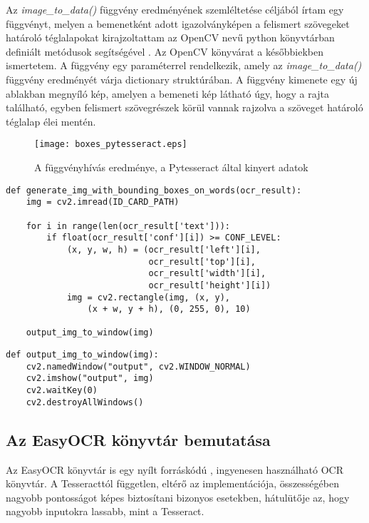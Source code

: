 \documentclass[12pt]{report}
\begin{document}
\pagebreak
Az \emph{image\_to\_data()} függvény eredményének szemléltetése céljából írtam egy függvényt, melyen a bemenetként adott igazolványképen a felismert szövegeket határoló téglalapokat kirajzoltattam az OpenCV nevű python könyvtárban definiált metódusok segítségével \cite{opencv}. Az OpenCV könyvárat a későbbiekben ismertetem. A függvény egy paraméterrel rendelkezik, amely az \emph{image\_to\_data()} függvény eredményét várja dictionary struktúrában. A függvény kimenete egy új ablakban megnyíló kép, amelyen a bemeneti kép látható úgy, hogy a rajta található, egyben felismert szövegrészek körül vannak rajzolva a szöveget határoló téglalap élei mentén.

\begin{figure}[h]
    \centerline{\texttt{[image: boxes\_pytesseract.eps]}}
    \caption{A függvényhívás eredménye, a Pytesseract által kinyert adatok}
\end{figure}

\begin{verbatim}
def generate_img_with_bounding_boxes_on_words(ocr_result):
    img = cv2.imread(ID_CARD_PATH)

    for i in range(len(ocr_result['text'])):
        if float(ocr_result['conf'][i]) >= CONF_LEVEL:
            (x, y, w, h) = (ocr_result['left'][i],
                            ocr_result['top'][i],
                            ocr_result['width'][i],
                            ocr_result['height'][i])
            img = cv2.rectangle(img, (x, y),
                (x + w, y + h), (0, 255, 0), 10)

    output_img_to_window(img)
\end{verbatim}

\begin{verbatim}
def output_img_to_window(img):
    cv2.namedWindow("output", cv2.WINDOW_NORMAL)
    cv2.imshow("output", img)
    cv2.waitKey(0)
    cv2.destroyAllWindows()
\end{verbatim}

\subsection{Az EasyOCR könyvtár bemutatása}

Az EasyOCR könyvtár is egy nyílt forráskódú \cite{easyocr}, ingyenesen használható OCR könyvtár. A Tesseracttól független, eltérő az implementációja, összességében nagyobb pontosságot képes biztosítani bizonyos esetekben, hátulütője az, hogy nagyobb inputokra lassabb, mint a Tesseract.
\end{document}
